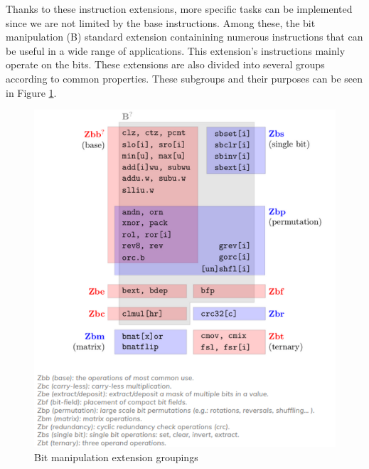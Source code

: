 Thanks to these instruction extensions, more specific tasks can be implemented since we are not limited by the base instructions.
Among these, the bit manipulation (B) standard extension containining numerous instructions that can be useful in a wide range of applications. This extension's instructions mainly operate on the bits. These extensions are also divided into several groups according to common properties. These subgroups and their purposes can be seen in Figure \ref{fig:bit_manipulation_extension_groupings}.
\begin{figure}[h!]
    \centering
    \includegraphics{riscv/bit_manipulation_extension_groupings.png}
    \caption{Bit manipulation extension groupings \cite{bitmanipgroups}}
    \label{fig:bit_manipulation_extension_groupings}
\end{figure}

